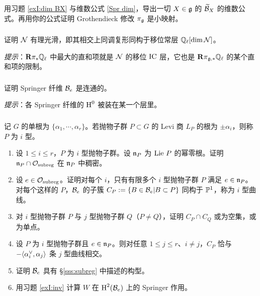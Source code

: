 \subsubsection{} 用习题 \ref{exI:dim BX} 与维数公式 \eqref{Spr dim}，导出一切 $X\in\mathfrak{g}$ 的 $\widetilde{\mathcal{B}}_{X}$ 的维数公式。再用你的公式证明 Grothendieck 修改 $\pi_{\mathfrak{g}}$ 是小映射。

\subsubsection{} 证明 $\mathcal{N}$ 有理光滑，即其相交上同调复形同构于移位常层 $\mathbb{Q}_{\ell}[\dim\mathcal{N}]$。

{\em 提示}：$\mathbf{R}\pi_{*}\mathbb{Q}_{\ell}$ 中最大的直和项就是 $\mathcal{N}$ 的移位 $\textup{IC}$ 层，它也是 $\mathbf{R}\pi_{\mathfrak{g},*}\mathbb{Q}_{\ell}$ 的某个直和项的限制。

\subsubsection{}\label{exI:conn} 证明 Springer 纤维 $\mathcal{B}_{e}$ 是连通的。

{\em 提示}：各 Springer 纤维的 $\textup{H}^{0}$ 被装在某一个层里。

\subsubsection{} 记 $G$ 的单根为 $\{\alpha_{1},\cdots,\alpha_{r}\}$。若抛物子群 $P\subset G$ 的 Levi 商 $L_{P}$ 的根为 $\pm\alpha_{i}$，则称 $P$ 为 $i$ 型。
\begin{enumerate}
\item 设 $1\leq i\leq r$，$P$ 为 $i$ 型抛物子群。设 $\mathfrak{n}_{P}$ 为 $\textup{Lie}\  P$ 的幂零根。证明 $\mathfrak{n}_{P}\cap \mathcal{O}_{\operatorname{subreg}}$ 在 $\mathfrak{n}_{P}$ 中稠密。
\item 设 $e\in\mathcal{O}_{\operatorname{subreg}}$。证明对每个 $i$，只有有限多个 $i$ 型抛物子群 $P$ 满足 $e\in\mathfrak{n}_{P}$。对每个这样的 $P$，$\mathcal{B}_{e}$ 的子簇 $C_{P}:=\{B\in\mathcal{B}_{e}|B\subset P\}$ 同构于 $\mathbb{P}^{1}$，称为 $i$ 型曲线。
\item 对 $i$ 型抛物子群 $P$ 与 $j$ 型抛物子群 $Q$（$P\neq Q$），证明 $C_{P}\cap C_{Q}$ 或为空集，或为单点。
\item 设 $P$ 为 $i$ 型抛物子群且 $e\in\mathfrak{n}_{P}$。则对任意 $1\leq j\leq r$、$i\neq j$，$C_{P}$ 恰与 $-\langle{\alpha^{\vee}_{i}, \alpha_{j}}\rangle$ 条 $j$ 型曲线相交。
\item 证明 $\mathcal{B}_{e}$ 具有 \S\ref{sss:subreg} 中描述的构型。
\item 用习题 \ref{exI:inv} 计算 $W$ 在 $\textup{H}^{2}({\mathcal{B}_{e}})$ 上的 Springer 作用。
\end{enumerate}
